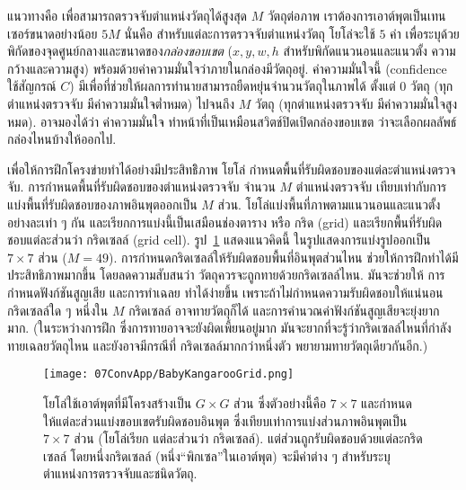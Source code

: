 แนวทางคือ
เพื่อสามารถตรวจจับตำแหน่งวัตถุได้สูงสุด $M$ วัตถุต่อภาพ 
เราต้องการเอาต์พุตเป็นเทนเซอร์ขนาดอย่างน้อย $5 M$
นั่นคือ สำหรับแต่ละการตรวจจับตำแหน่งวัตถุ โยโล่จะใช้ $5$ ค่า เพื่อระบุด้วยพิกัดของจุดศูนย์กลางและขนาดของ\textit{กล่องขอบเขต} ($x, y, w, h$ สำหรับพิกัดแนวนอนและแนวตั้ง ความกว้างและความสูง) พร้อมด้วยค่าความมั่นใจว่าภายในกล่องมีวัตถุอยู่.
ค่าความมั่นใจนี้ (confidence ใช้สัญกรณ์ $C$) มีเพื่อที่ช่วยให้ผลการทำนายสามารถยืดหยุ่นจำนวนวัตถุในภาพได้ ตั้งแต่ $0$ วัตถุ (ทุกตำแหน่งตรวจจับ มีค่าความมั่นใจต่ำหมด)
ไปจนถึง $M$ วัตถุ (ทุกตำแหน่งตรวจจับ มีค่าความมั่นใจสูงหมด).
อาจมองได้ว่า ค่าความมั่นใจ ทำหน้าที่เป็นเหมือนสวิตช์ปิดเปิดกล่องขอบเขต ว่าจะเลือกผลลัพธ์กล่องไหนบ้างให้ออกไป.

เพื่อให้การฝึกโครงข่ายทำได้อย่างมีประสิทธิิภาพ 
โยโล่ กำหนดพื้นที่รับผิดชอบของแต่ละตำแหน่งตรวจจับ.
การกำหนดพื้นที่รับผิดชอบของตำแหน่งตรวจจับ จำนวน $M$ ตำแหน่งตรวจจับ เทียบเท่ากับการแบ่งพื้นที่รับผิดชอบของภาพอินพุตออกเป็น $M$ ส่วน.
โยโล่แบ่งพื้นที่ภาพตามแนวนอนและแนวตั้งอย่างละเท่า ๆ กัน 
และเรียกการแบ่งนี้เป็นเสมือนช่องตาราง หรือ กริด (grid) และเรียกพื้นที่รับผิดชอบแต่ละส่วนว่า กริดเซลล์ (grid cell).
รูป~\ref{fig: Yolo Grid} แสดงแนวคิดนี้ ในรูปแสดงการแบ่งรูปออกเป็น $7 \times 7$ ส่วน ($M = 49$).
การกำหนดกริดเซลล์ให้รับผิดชอบพื้นที่อินพุตส่วนไหน ช่วยให้การฝึกทำได้มีประสิทธิภาพมากขึ้น 
โดยลดความสับสนว่า วัตถุควรจะถูกทายด้วยกริดเซลล์ไหน.
มันจะช่วยให้ การกำหนดฟังก์ชันสูญเสีย และการทำเฉลย ทำได้ง่ายขึ้น
เพราะถ้าไม่กำหนดความรับผิดชอบให้แน่นอน กริดเซลล์ใด ๆ หนึ่งใน $M$ กริดเซลล์ อาจทายวัตถุก็ได้
และการคำนวณค่าฟังก์ชันสูญเสียจะยุ่งยากมาก.
(ในระหว่างการฝึก ซึ่งการทายอาจจะยังผิดเพี้ยนอยู่มาก มันจะยากที่จะรู้ว่ากริดเซลล์ไหนที่กำลังทายเฉลยวัตถุไหน
และยังอาจมีกรณีที่ กริดเซลล์มากกว่าหนึ่งตัว พยายามทายวัตถุเดียวกันอีก.)

%
\begin{figure}
	\begin{center}
		\texttt{[image: 07ConvApp/BabyKangarooGrid.png]}
		\caption[โยโล่ใช้เอาต์พุตที่มีโครงสร้างเทียบเท่าการแบ่งส่วนภาพอินพุต]{
			โยโล่ใช้เอาต์พุตที่มีโครงสร้างเป็น $G \times G$ ส่วน ซึ่งตัวอย่างนี้คือ $7 \times 7$ 
			และกำหนดให้แต่ละส่วนแบ่งขอบเขตรับผิดชอบอินพุต
			ซึ่งเทียบเท่าการแบ่งส่วนภาพอินพุตเป็น $7 \times 7$ ส่วน (โยโล่เรียก แต่ละส่วนว่า กริดเซลล์). แต่ส่วนถูกรับผิดชอบด้วยแต่ละกริดเซลล์ โดยหนึ่งกริดเซลล์ (หนึ่ง``พิกเซล''ในเอาต์พุต) จะมีค่าต่าง ๆ สำหรับระบุตำแหน่งการตรวจจับและชนิดวัตถุ. 
		}
		\label{fig: Yolo Grid}
	\end{center}
\end{figure}
%

